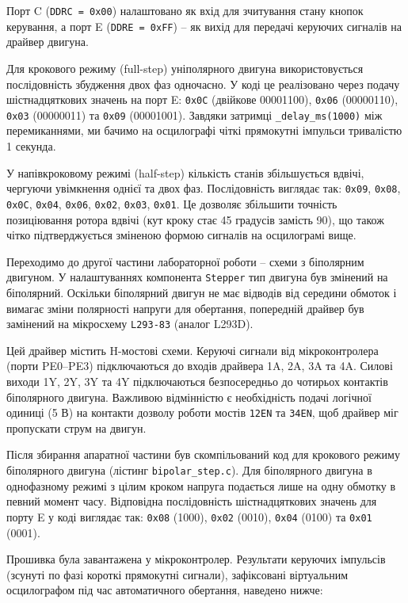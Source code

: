 \documentclass[14pt, a4paper]{extreport}
\begin{document}
	Порт C (\texttt{DDRC = 0x00}) налаштовано як вхід для зчитування стану кнопок керування, а порт E (\texttt{DDRE = 0xFF}) -- як вихід для передачі керуючих сигналів на драйвер двигуна. 
	
	Для крокового режиму (full-step) уніполярного двигуна використовується послідовність збудження двох фаз одночасно. У коді це реалізовано через подачу шістнадцяткових значень на порт E: \texttt{0x0C} (двійкове 00001100), \texttt{0x06} (00000110), \texttt{0x03} (00000011) та \texttt{0x09} (00001001). Завдяки затримці \texttt{\_delay\_ms(1000)} між перемиканнями, ми бачимо на осцилографі чіткі прямокутні імпульси тривалістю 1 секунда.
	
	У напівкроковому режимі (half-step) кількість станів збільшується вдвічі, чергуючи увімкнення однієї та двох фаз. Послідовність виглядає так: \texttt{0x09}, \texttt{0x08}, \texttt{0x0C}, \texttt{0x04}, \texttt{0x06}, \texttt{0x02}, \texttt{0x03}, \texttt{0x01}. Це дозволяє збільшити точність позиціювання ротора вдвічі (кут кроку стає 45 градусів замість 90), що також чітко підтверджується зміненою формою сигналів на осцилограмі вище.
	
	Переходимо до другої частини лабораторної роботи -- схеми з біполярним двигуном. У налаштуваннях компонента \texttt{Stepper} тип двигуна був змінений на біполярний. Оскільки біполярний двигун  не має відводів від середини обмоток і вимагає зміни полярності напруги для обертання, попередній драйвер був замінений на мікросхему \texttt{L293-83} (аналог L293D). 
	
	Цей драйвер містить H-мостові схеми. Керуючі сигнали від мікроконтролера (порти PE0--PE3) підключаються до входів драйвера 1A, 2A, 3A та 4A. Силові виходи 1Y, 2Y, 3Y та 4Y підключаються безпосередньо до чотирьох контактів біполярного двигуна. Важливою відмінністю є необхідність подачі логічної одиниці (5 В) на контакти дозволу роботи мостів \texttt{12EN} та \texttt{34EN}, щоб драйвер міг пропускати струм на двигун.
	
	
	Після збирання апаратної частини був скомпільований код для крокового режиму біполярного двигуна (лістинг \texttt{bipolar\_step.c}). Для біполярного двигуна в однофазному режимі з цілим кроком напруга подається лише на одну обмотку в певний момент часу. Відповідна послідовність шістнадцяткових значень для порту E у коді виглядає так: \texttt{0x08} (1000), \texttt{0x02} (0010), \texttt{0x04} (0100) та \texttt{0x01} (0001).
	
	Прошивка була завантажена у мікроконтролер. Результати керуючих імпульсів (зсунуті по фазі короткі прямокутні сигнали), зафіксовані віртуальним осцилографом під час автоматичного обертання, наведено нижче:
	
\end{document}
